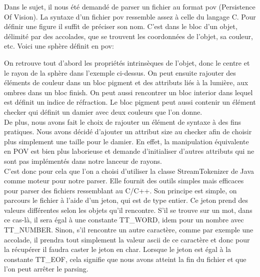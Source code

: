 \documentclass[../../Rapport RayTracer]{subfiles}
\begin{document}
Dans le sujet, il nous été demandé de parser un fichier au format pov (Persistence Of Vision). La syntaxe d'un fichier pov ressemble assez à celle du langage C. Pour définir une figure il suffit de préciser son nom. C'est dans le bloc d'un objet, délimité par des accolades, que se trouvent les coordonnées de l'objet, sa couleur, etc. Voici une sphère définit en pov:

 

On retrouve tout d'abord les propriétés intrinsèques de l'objet, donc le centre et le rayon de la sphère dans l'exemple ci-dessus. On peut ensuite rajouter des éléments de couleur dans un bloc pigment et des attributs liés à la lumière, aux ombres dans un bloc finish. On peut aussi rencontrer un bloc interior dans lequel est définit un indice de réfraction.
Le bloc pigment peut aussi contenir un élément checker qui définit un damier avec deux couleurs que l'on donne.
\\
De plus, nous avons fait le choix de rajouter un élément de syntaxe à des fins pratiques. Nous avons décidé d'ajouter un attribut size au checker afin de choisir plus simplement une taille pour le damier. En effet, la manipulation équivalente en POV est bien plus laborieuse et demande d'initialiser d'autres attributs qui ne sont pas implémentés dans notre lanceur de rayons.
\\
C'est donc pour cela que l'on a choisi d'utiliser la classe StreamTokenizer de Java comme moteur pour notre parser. Elle fournit des outils simples mais efficaces pour parser des fichiers ressemblant au C/C++. Son principe est simple, on parcours le fichier à l'aide d'un jeton, qui est de type entier. Ce jeton prend des valeurs différentes selon les objets qu'il rencontre. S'il se trouve sur un mot, dans ce cas-là, il sera égal à une constante TT\_WORD, idem pour un nombre avec TT\_NUMBER. Sinon, s'il rencontre un autre caractère, comme par exemple une accolade, il prendra tout simplement la valeur ascii de ce caractère et donc pour la récupérer il faudra caster le jeton en char. Lorsque le jeton est égal à la constante TT\_EOF, cela signifie que nous avons atteint la fin du fichier et que l'on peut arrêter le parsing.
\end{document}
